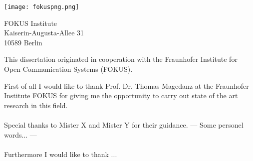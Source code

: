 \thispagestyle{empty}
\vspace*{3cm}


\begin{center}
\texttt{[image: fokuspng.png]}
\end{center}

\vspace*{0.2cm}

\begin{center}
FOKUS Institute\\
Kaiserin-Augusta-Allee 31\\
10589 Berlin\\
\end{center}
\vspace*{0.5cm}

\noindent This dissertation originated in cooperation with the Fraunhofer Institute for Open Communication Systems (FOKUS).

\vspace*{1cm}
\noindent
First of all I would like to thank Prof. Dr. Thomas Magedanz at the Fraunhofer Institute FOKUS for giving me the opportunity to carry out state of the art research in this field.
\\
\\
Special thanks to Mister X and Mister Y for their guidance. --- Some personel words... ---
\\
\\
Furthermore I would like to thank ...
